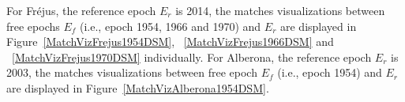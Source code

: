 For Fr{\'e}jus, the reference epoch $E_r$ is 2014, the matches visualizations between free epochs $E_f$ (i.e., epoch 1954, 1966 and 1970) and $E_r$ are displayed in Figure~\ref{MatchVizFrejus1954DSM}, ~\ref{MatchVizFrejus1966DSM} and ~\ref{MatchVizFrejus1970DSM} individually. 
For Alberona, the reference epoch $E_r$ is 2003, the matches visualizations between free epoch $E_f$ (i.e., epoch 1954) and $E_r$ are displayed in Figure~\ref{MatchVizAlberona1954DSM}. %
%

